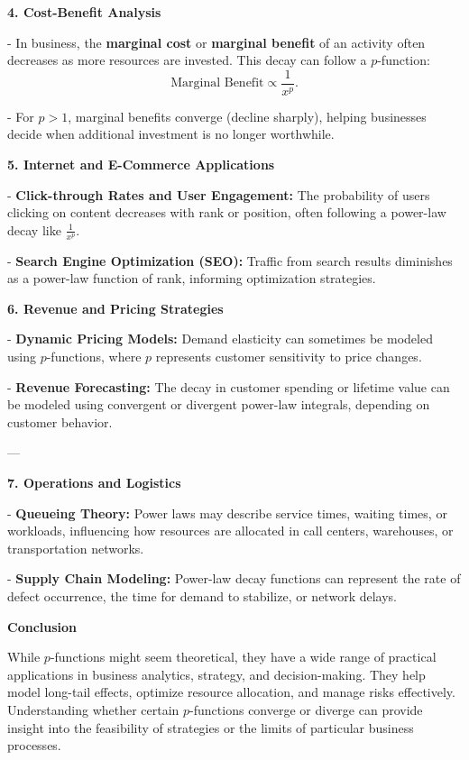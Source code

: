 \documentclass[a4paper,12pt]{book}
\begin{document}
\textbf{4. Cost-Benefit Analysis}

- In business, the \textbf{marginal cost} or \textbf{marginal benefit} of an activity often decreases as more resources are invested. This decay can follow a \( p \)-function:  \[
  \text{Marginal Benefit} \propto \frac{1}{x^p}.
  \]


- For \( p > 1 \), marginal benefits converge (decline sharply), helping businesses decide when additional investment is no longer worthwhile.

\textbf{5. Internet and E-Commerce Applications}


- \textbf{Click-through Rates and User Engagement:}    The probability of users clicking on content decreases with rank or position, often following a power-law decay like \( \frac{1}{x^p} \).


- \textbf{Search Engine Optimization (SEO):}    Traffic from search results diminishes as a power-law function of rank, informing optimization strategies.

\textbf{6. Revenue and Pricing Strategies}


- \textbf{Dynamic Pricing Models:}    Demand elasticity can sometimes be modeled using \( p \)-functions, where \( p \) represents customer sensitivity to price changes.


- \textbf{Revenue Forecasting:}    The decay in customer spending or lifetime value can be modeled using convergent or divergent power-law integrals, depending on customer behavior.

---

\textbf{7. Operations and Logistics}


- \textbf{Queueing Theory:}    Power laws may describe service times, waiting times, or workloads, influencing how resources are allocated in call centers, warehouses, or transportation networks.


- \textbf{Supply Chain Modeling:}    Power-law decay functions can represent the rate of defect occurrence, the time for demand to stabilize, or network delays.

\textbf{Conclusion}

While \( p \)-functions might seem theoretical, they have a wide range of practical applications in business analytics, strategy, and decision-making. They help model long-tail effects, optimize resource allocation, and manage risks effectively. Understanding whether certain \( p \)-functions converge or diverge can provide insight into the feasibility of strategies or the limits of particular business processes.
\end{document}

